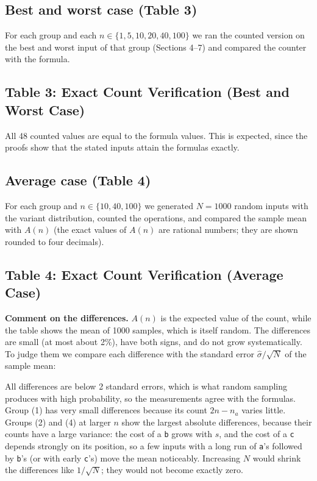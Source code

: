 \documentclass[11pt]{article}
\theoremstyle{remark}
\newcommand{\ta}{\texttt{a}}
\newcommand{\tb}{\texttt{b}}
\newcommand{\tc}{\texttt{c}}
\begin{document}
\subsection{Best and worst case (Table 3)}
For each group and each $n\in\{1,5,10,20,40,100\}$ we ran the counted version on the best and worst input of that
group (Sections 4--7) and compared the counter with the formula.

\newpage
\subsection*{Table 3: Exact Count Verification (Best and Worst Case)}


All 48 counted values are equal to the formula values. This is expected, since the proofs show that the stated inputs
attain the formulas exactly.

\newpage
\subsection{Average case (Table 4)}
For each group and $n\in\{10,40,100\}$ we generated $N=1000$ random inputs with the variant distribution, counted the
operations, and compared the sample mean with $A(n)$ (the exact values of $A(n)$ are rational numbers; they are shown
rounded to four decimals).

\subsection*{Table 4: Exact Count Verification (Average Case)}


\noindent\begin{minipage}{\linewidth}
\setlength{\parskip}{0.35em}
\textbf{Comment on the differences.} $A(n)$ is the expected value of the count, while the table shows the mean of 1000
samples, which is itself random. The differences are small (at most about 2\%), have both signs, and do not grow
systematically. To judge them we compare each difference with the standard error $\hat\sigma/\sqrt N$ of the sample
mean:
\begin{center}\small

\end{center}
\end{minipage}

All differences are below 2 standard errors, which is what random sampling produces with high probability, so the
measurements agree with the formulas. Group (1) has very small differences because its count $2n-n_a$ varies little.
Groups (2) and (4) at larger $n$ show the largest absolute differences, because their counts have a large variance: the
cost of a \tb{} grows with $s$, and the cost of a \tc{} depends strongly on its position, so a few inputs with a long run
of \ta's followed by \tb's (or with early \tc's) move the mean noticeably. Increasing $N$ would shrink the differences
like $1/\sqrt N$; they would not become exactly zero.
\end{document}
